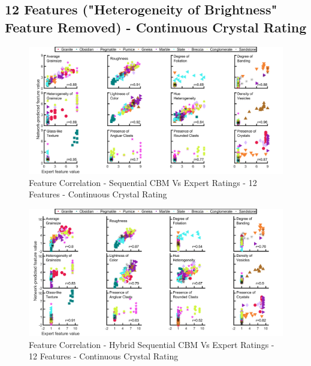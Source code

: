 \subsection{12 Features ("Heterogeneity of Brightness" Feature Removed) - Continuous Crystal Rating}

\begin{figure}[H]
  \centering
    \includegraphics[width=\textwidth]{images/MATLAB Correlation - C2_Vs_Expert - 12 Feautres - Continuous.png}
    \caption{Feature Correlation - Sequential CBM Vs Expert Ratings - 12 Features - Continuous Crystal Rating} \label{fig:Feature Correlation - Sequential CBM Vs Expert Ratings - 12 Features - Continuous Crystal Rating}
\end{figure}

\begin{figure}[H]
  \centering
    \includegraphics[width=\textwidth]{images/MATLAB Correlation - Hybrid_Vs_Expert - 12 Feautres - Continuous.png}
    \caption{Feature Correlation - Hybrid Sequential CBM Vs Expert Ratings - 12 Features - Continuous Crystal Rating} \label{fig:Feature Correlation - Hybrid Sequential CBM Vs Expert Ratings - 12 Features - Continuous Crystal Rating}
\end{figure}


